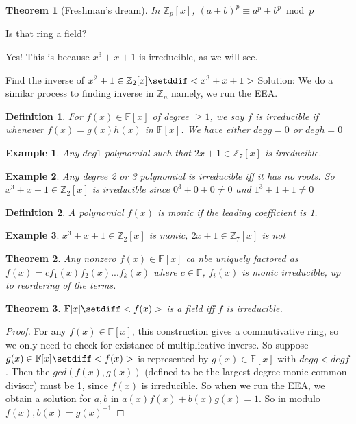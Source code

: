 \documentclass{article}
\newtheorem{thm}{Theorem}
\newtheorem{defn}{Definition}
\newtheorem{eg}{Example}
\begin{document}
\begin{thm}[Freshman's dream]
    In $\mathbb{Z}_p[x]$, $(a+b)^p \equiv a^p + b^p \bmod{p}$
\end{thm}

Is that ring a field?

Yes! This is because $x^3+x+1$ is irreducible, as we will see.


Find the inverse of $x^2 + 1\in\mathbb{Z}_2[x]\setddif <x^3+x+1>$
Solution: We do a similar process to finding inverse in $\mathbb{Z}_n$ namely, we
run the EEA.

\begin{defn}
    For $f(x)\in\mathbb{F}[x]$ of degree $\geq 1$, we say $f$ is irreducible if
    whenever $f(x) = g(x)h(x)$ in $\mathbb{F}[x]$. We have either
    $deg g = 0$ or $deg h = 0$
\end{defn}

\begin{eg}
    Any $deg 1$ polynomial such that $2x+1\in\mathbb{Z}_7[x]$ is irreducible.
\end{eg}

\begin{eg}
    Any degree 2 or 3 polynomial is irreducible iff it has no roots. So
    $x^3 + x + 1\in\mathbb{Z}_2[x]$ is irreducible since $0^3 + 0 + 0 \ne 0$ and
    $1^3 + 1 + 1 \ne 0$
\end{eg}

\begin{defn}
    A polynomial $f(x)$ is monic if the leading coefficient is 1.
\end{defn}

\begin{eg}
    $x^3 + x + 1\in\mathbb{Z}_2[x]$ is monic, $2x+1\in\mathbb{Z}_7[x]$ is not
\end{eg}

\begin{thm}
    Any nonzero $f(x)\in\mathbb{F}[x]$ ca nbe uniquely factored as
    $f(x) = cf_1(x)f_2(x)...f_k(x)$ where $c\in\mathbb{F}$, $f_i(x)$ is
    monic irreducible, up to reordering of the terms.
\end{thm}

\begin{thm}
    $\mathbb{F}[x]\setdiff<f(x)>$ is a field iff $f$ is irreducible.
\end{thm}

\begin{proof}
    For any $f(x)\in\mathbb{F}[x]$, this construction gives a commutivative ring, so
    we only need to check for existance of multiplicative inverse. So suppose
    $g(x)\in\mathbb{F}[x]\setdiff<f(x)>$ is represented by $g(x)\in\mathbb{F}[x]$ with
    $deg g < deg f$. Then the $gcd(f(x), g(x))$ (defined to be the largest degree monic
    common divisor) must be 1, since $f(x)$ is irreducible. So when we run the EEA, we
    obtain a solution for $a,b$ in $a(x)f(x) + b(x)g(x) = 1$. So in modulo $f(x) ,
    b(x) = g(x)^{-1}$
\end{proof}
\end{document}
